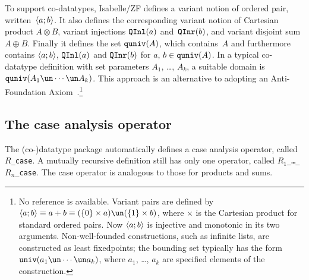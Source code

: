 To support co-datatypes, Isabelle/ZF defines a variant notion of ordered
pair, written~$\langle a;b\rangle$.  It also defines the corresponding variant
notion of Cartesian product $A\otimes B$, variant injections ${\tt QInl}(a)$
and~${\tt QInr}(b)$, and variant disjoint sum $A\oplus B$.  Finally it defines
the set ${\tt quniv}(A)$, which contains~$A$ and furthermore contains
$\langle a;b\rangle$, ${\tt QInl}(a)$ and ${\tt QInr}(b)$ for $a$, $b\in{\tt quniv}(A)$.  In a
typical co-datatype definition with set parameters $A_1$, \ldots, $A_k$, a
suitable domain is $\quniv(A_1\un\cdots\un A_k)$.  This approach is an
alternative to adopting an Anti-Foundation
Axiom~\cite{aczel88}.\footnote{No reference is available.  Variant pairs
  are defined by $\pair{a;b}\equiv a+b \equiv (\{0\}\times a) \un (\{1\}\times
  b)$, where $\times$ is the Cartesian product for standard ordered pairs.  Now
  $\langle a;b\rangle$ is injective and monotonic in its two arguments.
  Non-well-founded constructions, such as infinite lists, are constructed
  as least fixedpoints; the bounding set typically has the form
  $\univ(a_1\un\cdots\un a_k)$, where $a_1$, \ldots, $a_k$ are specified
  elements of the construction.}


\subsection{The case analysis operator}
The (co-)datatype package automatically defines a case analysis operator,
called {\tt$R$\_case}.  A mutually recursive definition still has only
one operator, called {\tt$R_1$\_\ldots\_$R_n$\_case}.  The case operator is
analogous to those for products and sums.  

